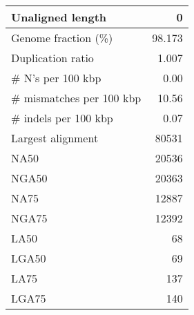 \documentclass[12pt,a4paper]{article}
\begin{document}
\begin{table}[ht]
\begin{center}
\begin{tabular}{|l*{1}{|r}|}
Unaligned length & 0 \\ \hline
Genome fraction (\%) & 98.173 \\ \hline
Duplication ratio & 1.007 \\ \hline
\# N's per 100 kbp & 0.00 \\ \hline
\# mismatches per 100 kbp & 10.56 \\ \hline
\# indels per 100 kbp & 0.07 \\ \hline
Largest alignment & 80531 \\ \hline
NA50 & 20536 \\ \hline
NGA50 & 20363 \\ \hline
NA75 & 12887 \\ \hline
NGA75 & 12392 \\ \hline
LA50 & 68 \\ \hline
LGA50 & 69 \\ \hline
LA75 & 137 \\ \hline
LGA75 & 140 \\ \hline
\end{tabular}
\end{center}
\end{table}
\end{document}
